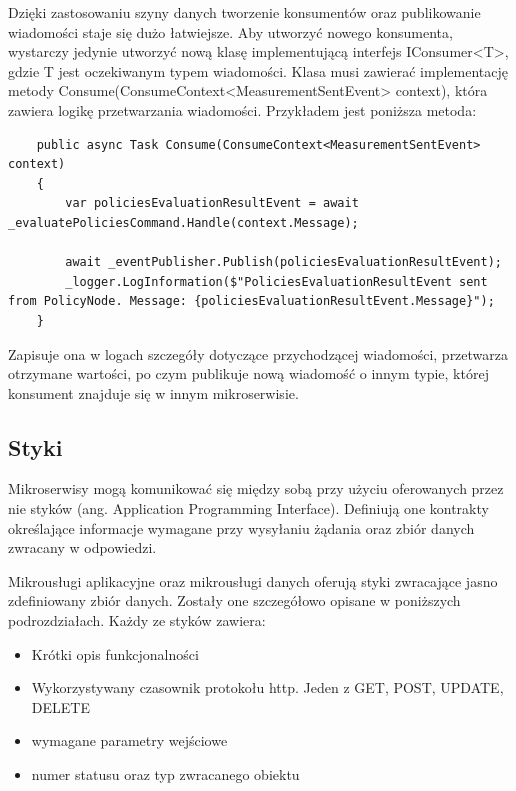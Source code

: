 \documentclass[11pt, a4]{article} %
\begin{document}
Dzięki zastosowaniu szyny danych tworzenie konsumentów oraz publikowanie wiadomości 
staje się dużo łatwiejsze. Aby utworzyć nowego konsumenta, wystarczy jedynie utworzyć 
nową klasę implementującą interfejs IConsumer<T>, gdzie T jest oczekiwanym typem 
wiadomości. Klasa musi zawierać implementację metody 
Consume(ConsumeContext<MeasurementSentEvent> context), która zawiera logikę 
przetwarzania wiadomości. Przykładem jest poniższa metoda:

\begin{lstlisting}
    public async Task Consume(ConsumeContext<MeasurementSentEvent> context)
    {
        var policiesEvaluationResultEvent = await _evaluatePoliciesCommand.Handle(context.Message);

        await _eventPublisher.Publish(policiesEvaluationResultEvent);
        _logger.LogInformation($"PoliciesEvaluationResultEvent sent from PolicyNode. Message: {policiesEvaluationResultEvent.Message}");
    }

    \end{lstlisting}
    
Zapisuje ona w logach szczegóły dotyczące przychodzącej wiadomości, przetwarza 
otrzymane wartości, po czym publikuje nową wiadomość o innym typie, której konsument 
znajduje się w innym mikroserwisie.

\subsection{Styki}

Mikroserwisy mogą komunikować się między sobą przy użyciu oferowanych przez nie 
styków (ang. Application Programming Interface). Definiują one kontrakty 
określające informacje wymagane przy wysyłaniu żądania oraz zbiór danych zwracany 
w odpowiedzi.

Mikrousługi aplikacyjne oraz mikrousługi danych oferują styki zwracające jasno 
zdefiniowany zbiór danych. Zostały one szczegółowo opisane w poniższych podrozdziałach. 
Każdy ze styków zawiera:

\begin{itemize} %
    \item Krótki opis funkcjonalności
    \item Wykorzystywany czasownik protokołu http. Jeden z GET, POST, UPDATE, DELETE
    \item wymagane parametry wejściowe
    \item numer statusu oraz typ zwracanego obiektu
\end{itemize}
\end{document}
